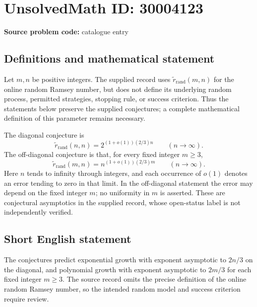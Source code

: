 \documentclass[11pt]{article}
\begin{document}
\section*{UnsolvedMath ID: 30004123}
\textbf{Source problem code:} catalogue entry
\subsection{Definitions and mathematical statement}
Let \(m,n\) be positive integers. The supplied record uses \(\widetilde r_{\mathrm{rand}}(m,n)\) for the online random Ramsey number, but does not define its underlying random process, permitted strategies, stopping rule, or success criterion. Thus the statements below preserve the supplied conjectures; a complete mathematical definition of this parameter remains necessary.

The diagonal conjecture is
\[
\widetilde r_{\mathrm{rand}}(n,n)=2^{(1+o(1))(2/3)n}
\qquad(n\to\infty).
\]
The off-diagonal conjecture is that, for every fixed integer \(m\geq3\),
\[
\widetilde r_{\mathrm{rand}}(m,n)=n^{(1+o(1))(2/3)m}
\qquad(n\to\infty).
\]
Here \(n\) tends to infinity through integers, and each occurrence of \(o(1)\) denotes an error tending to zero in that limit. In the off-diagonal statement the error may depend on the fixed integer \(m\); no uniformity in \(m\) is asserted. These are conjectural asymptotics in the supplied record, whose open-status label is not independently verified.
\subsection{Short English statement}
The conjectures predict exponential growth with exponent asymptotic to \(2n/3\) on the diagonal, and polynomial growth with exponent asymptotic to \(2m/3\) for each fixed integer \(m\geq3\). The source record omits the precise definition of the online random Ramsey number, so the intended random model and success criterion require review.
\end{document}
